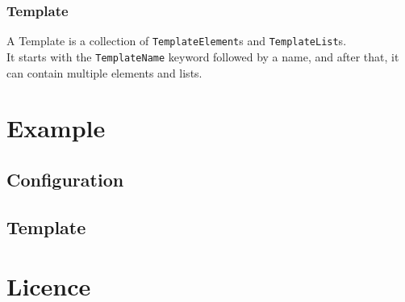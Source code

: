 \documentclass[12pt]{article}
\begin{document}
    \subsubsection{Template}
    A Template is a collection of \texttt{TemplateElement}s and \texttt{TemplateList}s. \\
    It starts with the \texttt{TemplateName} keyword followed by a name, and after that, it can contain multiple elements and lists.

    \newpage

    \section{Example}
    \begin{minipage}[t]{0.49\textwidth}
        \subsection{Configuration}
        
    \end{minipage}
    \begin{minipage}[t]{0.49\textwidth}
        \subsection{Template}
        
    \end{minipage}

    \newpage

    \section{Licence}
    \doclicenseThis
\end{document}
